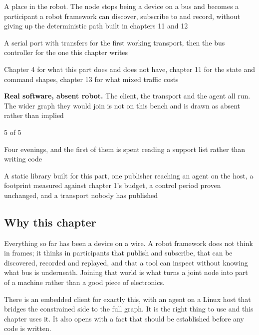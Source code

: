 
\begin{keyfacts}
\item[Adds to the node] A place in the robot. The node stops being a device on a
bus and becomes a participant a robot framework can discover, subscribe to and
record, without giving up the deterministic path built in chapters 11 and 12
\item[Peripherals] A serial port with transfers for the first working transport,
then the bus controller for the one this chapter writes
\item[Depends on] Chapter 4 for what this part does and does not have, chapter 11
for the state and command shapes, chapter 13 for what mixed traffic costs
\item[Real or modelled] \textbf{Real software, absent robot.} The client, the
transport and the agent all run. The wider graph they would join is not on this
bench and is drawn as absent rather than implied
\item[Difficulty] 5 of 5
\item[Effort] Four evenings, and the first of them is spent reading a support
list rather than writing code
\item[Deliverable] A static library built for this part, one publisher reaching
an agent on the host, a footprint measured against chapter 1's budget, a control
period proven unchanged, and a transport nobody has published
\end{keyfacts}

\subsection*{Why this chapter}

Everything so far has been a device on a wire. A robot framework does not think
in frames; it thinks in participants that publish and subscribe, that can be
discovered, recorded and replayed, and that a tool can inspect without knowing
what bus is underneath. Joining that world is what turns a joint node into part
of a machine rather than a good piece of electronics.

There is an embedded client for exactly this, with an agent on a Linux host that
bridges the constrained side to the full graph. It is the right thing to use and
this chapter uses it. It also opens with a fact that should be established
before any code is written.


